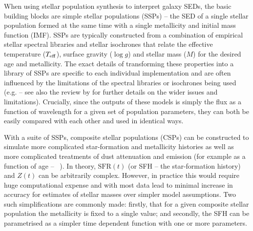 When using stellar population synthesis to interpret galaxy SEDs, the basic building blocks are simple stellar populations (SSPs) -- the SED of a single stellar population formed at the same time with a single metallicity and initial mass function (IMF). SSPs are typically constructed from a combination of empirical stellar spectral libraries and stellar isochrones that relate the effective temperature ($T_{\rm{eff}}$), surface gravity ($\log g$) and stellar mass ($M$) for the desired age and metallicity. The exact details of transforming these properties into a library of SSPs are specific to each individual implementation and are often influenced by the limitations of the spectral libraries or isochrones being used (e.g. \citet{Leitherer:1999jt, Bruzual:2003ckb, Maraston:2005er} -- see also the review by \citet{Conroy:2013dk} for further details on the wider issues and limitations). Crucially, since the outputs of these models is simply the flux as a function of wavelength for a given set of population parameters, they can both be easily compared with each other and used in identical ways. 

With a suite of SSPs, composite stellar populations (CSPs) can be constructed to simulate more complicated star-formation and metallicity histories as well as more complicated treatments of dust attenuation and emission (for example as a function of age -- \citeauthor{2000ApJ...539..718C}~\citeyear{2000ApJ...539..718C}). In theory, $\text{SFR}(t)$ (or SFH -- the star-formation history) and $Z(t)$ can be arbitrarily complex. However, in practice this would require huge computational expense and with most data lead to minimal increase in accuracy for estimates of stellar masses over simpler model assumptions. Two such simplifications are commonly made: firstly, that for a given composite stellar population the metallicity is fixed to a single value; and secondly, the SFH can be parametrised as a simpler time dependent function with one or more parameters.


